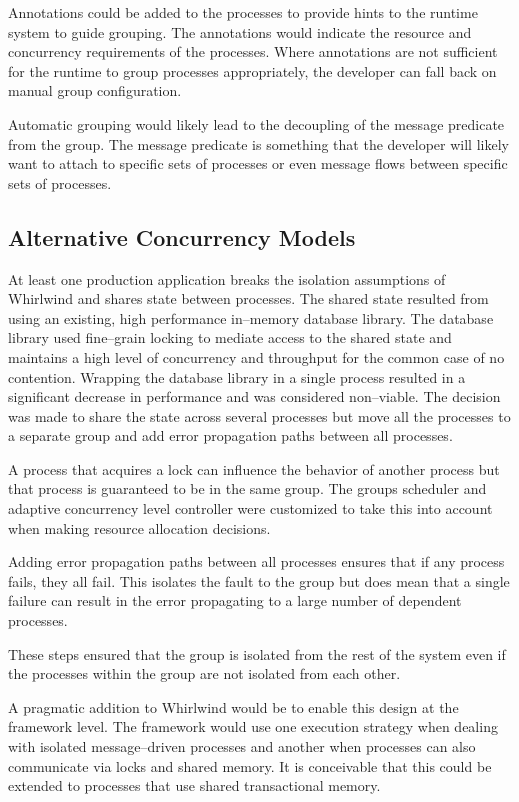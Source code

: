\documentclass[conference]{IEEEtran}
\begin{document}
Annotations could be added to the processes to provide hints to the runtime system to guide grouping. The annotations would indicate the resource and concurrency requirements of the processes. Where annotations are not sufficient for the runtime to group processes appropriately, the developer can fall back on manual group configuration.

Automatic grouping would likely lead to the decoupling of the message predicate from the group. The message predicate is something that the developer will likely want to attach to specific sets of processes or even message flows between specific sets of processes.

\subsection{Alternative Concurrency Models}

At least one production application breaks the isolation assumptions of Whirlwind and shares state between processes. The shared state resulted from using an existing, high performance in--memory database library. The database library used fine--grain locking to mediate access to the shared state and maintains a high level of concurrency and throughput for the common case of no contention. Wrapping the database library in a single process resulted in a significant decrease in performance and was considered non--viable. The decision was made to share the state across several processes but move all the processes to a separate group and add error propagation paths between all processes. 

A process that acquires a lock can influence the behavior of another process but that process is guaranteed to be in the same group. The groups scheduler and adaptive concurrency level controller were customized to take this into account when making resource allocation decisions.

Adding error propagation paths between all processes ensures that if any process fails, they all fail. This isolates the fault to the group but does mean that a single failure can result in the error propagating to a large number of dependent processes.

These steps ensured that the group is isolated from the rest of the system even if the processes within the group are not isolated from each other.

A pragmatic addition to Whirlwind would be to enable this design at the framework level. The framework would use one execution strategy when dealing with isolated message--driven processes and another when processes can also communicate via locks and shared memory. It is conceivable that this could be extended to processes that use shared transactional memory.
\end{document}
